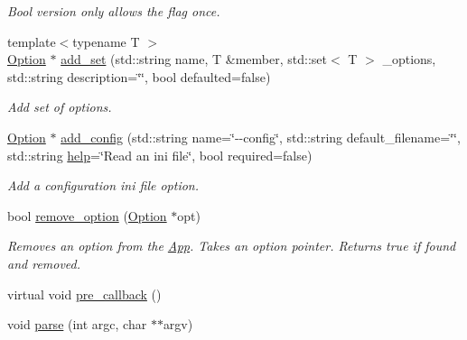 \begin{DoxyCompactItemize}
\begin{DoxyCompactList}\small\item\em Bool version only allows the flag once. \end{DoxyCompactList}\item 
{\footnotesize template$<$typename T $>$ }\\\hyperlink{class_c_l_i_1_1_option}{Option} $\ast$ \hyperlink{class_c_l_i_1_1_app_a97a0355faf6b17bdb1f5f34b1371eaac}{add\+\_\+set} (std\+::string name, T \&member, std\+::set$<$ T $>$ \+\_\+options, std\+::string description=\char`\"{}\char`\"{}, bool defaulted=false)
\begin{DoxyCompactList}\small\item\em Add set of options. \end{DoxyCompactList}\item 
\mbox{\label{class_c_l_i_1_1_app_a7ca58da6a7d884e09cd964d5544eabd1}} 
\hyperlink{class_c_l_i_1_1_option}{Option} $\ast$ \hyperlink{class_c_l_i_1_1_app_a7ca58da6a7d884e09cd964d5544eabd1}{add\+\_\+config} (std\+::string name=\char`\"{}-\/-\/config\char`\"{}, std\+::string default\+\_\+filename=\char`\"{}\char`\"{}, std\+::string \hyperlink{class_c_l_i_1_1_app_ab85cc077e2dfee3bd94eed8c61e1e2ea}{help}=\char`\"{}Read an ini file\char`\"{}, bool required=false)
\begin{DoxyCompactList}\small\item\em Add a configuration ini file option. \end{DoxyCompactList}\item 
\mbox{\label{class_c_l_i_1_1_app_a3058b128735eec0813589b56c5453115}} 
bool \hyperlink{class_c_l_i_1_1_app_a3058b128735eec0813589b56c5453115}{remove\+\_\+option} (\hyperlink{class_c_l_i_1_1_option}{Option} $\ast$opt)
\begin{DoxyCompactList}\small\item\em Removes an option from the \hyperlink{class_c_l_i_1_1_app}{App}. Takes an option pointer. Returns true if found and removed. \end{DoxyCompactList}\item 
virtual void \hyperlink{class_c_l_i_1_1_app_a5d74be8e210e779874584a3336aaf506}{pre\+\_\+callback} ()
\item 
void \hyperlink{class_c_l_i_1_1_app_ab1b5f580b80240cd54f00386be4fa08f}{parse} (int argc, char $\ast$$\ast$argv)
\item 
\mbox{\label{class_c_l_i_1_1_app_a878c1067ade7145aa11478d64f5173ed}} 
$$
\end{DoxyCompactItemize}

